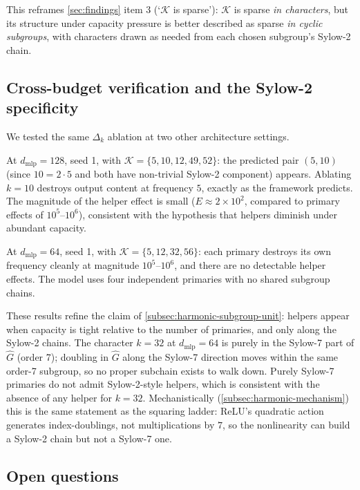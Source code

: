 This reframes \cref{sec:findings} item 3 (`$\mathcal{K}$ is sparse'):
$\mathcal{K}$ is sparse \emph{in characters}, but its structure under
capacity pressure is better described as sparse \emph{in cyclic
subgroups}, with characters drawn as needed from each chosen subgroup's
Sylow-2 chain.

\subsection{Cross-budget verification and the Sylow-2 specificity}
\label{subsec:harmonic-verification}

We tested the same $\Delta_k$ ablation at two other architecture settings.

At $d_{\text{mlp}} = 128$, seed 1, with $\mathcal{K} = \{5, 10, 12, 49,
52\}$: the predicted pair $(5, 10)$ (since $10 = 2 \cdot 5$ and both
have non-trivial Sylow-2 component) appears. Ablating $k = 10$ destroys
output content at frequency $5$, exactly as the framework predicts. The
magnitude of the helper effect is small ($E \approx 2 \times 10^2$,
compared to primary effects of $10^5$--$10^6$), consistent with the
hypothesis that helpers diminish under abundant capacity.

At $d_{\text{mlp}} = 64$, seed 1, with $\mathcal{K} = \{5, 12, 32, 56\}$:
each primary destroys its own frequency cleanly at magnitude $10^5$--$10^6$,
and there are no detectable helper effects. The model uses four
independent primaries with no shared subgroup chains.

These results refine the claim of \cref{subsec:harmonic-subgroup-unit}:
helpers appear when capacity is tight relative to the number of primaries,
and only along the Sylow-2 chains. The character $k = 32$ at
$d_{\text{mlp}} = 64$ is purely in the Sylow-7 part of $\widehat{G}$
(order 7); doubling in $\widehat{G}$ along the Sylow-7 direction moves
within the same order-7 subgroup, so no proper subchain exists to walk
down. Purely Sylow-7 primaries do not admit Sylow-2-style helpers, which
is consistent with the absence of any helper for $k = 32$. Mechanistically
(\cref{subsec:harmonic-mechanism}) this is the same statement as the
squaring ladder: ReLU's quadratic action generates index-doublings, not
multiplications by $7$, so the nonlinearity can build a Sylow-2 chain but
not a Sylow-7 one.

\subsection{Open questions}
\label{subsec:harmonic-open}

